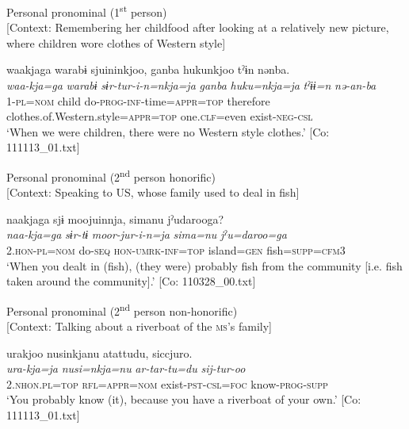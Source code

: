 \ea\label{ex:6-99}
 \ea Personal pronominal (1\textsuperscript{st} person)\\{}
[Context: Remembering her childfood after looking at a relatively new picture, where children wore clothes of Western style]

{\TM}
\glll waakjaga  warabɨ  sjuininkjoo,  ganba      hukunkjoo  tˀɨn  nənba.\\
      \textit{waa-kja=ga}  \textit{warabɨ}  \textit{sɨr-tur-i-n=nkja=ja}  \textit{ganba}      \textit{huku=nkja=ja}  \textit{tˀɨɨ=n}  \textit{nə-an-ba}\\
      1-\textsc{pl}=\textsc{nom}  child  do-\textsc{prog}-\textsc{inf}-time=\textsc{appr}=\textsc{top}  therefore      clothes.of.Western.style=\textsc{appr}=\textsc{top}  one.\textsc{clf}=even  exist-\textsc{neg}-\textsc{csl}\\
\glt ‘When we were children, there were no Western style clothes.’ [Co: 111113\_01.txt]
\z

\ex Personal pronominal (2\textsuperscript{nd} person honorific)\\{}
[Context: Speaking to US, whose family used to deal in fish]

{\TM}
\glll naakjaga  sjɨ  moojuinnja,  simanu      jˀudarooga?\\
      \textit{naa-kja=ga}  \textit{sɨr-tɨ}  \textit{moor-jur-i-n=ja}  \textit{sima=nu}     \textit{jˀu=daroo=ga}\\
      2.\textsc{hon}-\textsc{pl}=\textsc{nom}  do-\textsc{seq}  \textsc{hon}-\textsc{umrk}-\textsc{inf}=\textsc{top}  island=\textsc{gen}      fish=\textsc{supp}=\textsc{cfm}3\\
\glt ‘When you dealt in (fish), (they were) probably fish from the community [i.e. fish taken around the community].’ [Co: 110328\_00.txt]
\z

\ex Personal pronominal (2\textsuperscript{nd} person non-honorific)\\{}
[Context: Talking about a riverboat of the \textsc{ms}’s family]

{\TM}
\glll urakjoo  nusinkjanu  atattudu,  siccjuro.\\
      \textit{ura-kja=ja}  \textit{nusi=nkja=nu}  \textit{ar-tar-tu=du}  \textit{sij-tur-oo}\\
      2.\textsc{nhon}.\textsc{pl}=\textsc{top}  \textsc{rfl}=\textsc{appr}=\textsc{nom}  exist-\textsc{pst}-\textsc{csl}=\textsc{foc}      know-\textsc{prog}-\textsc{supp}\\
\glt ‘You probably know (it), because you have a riverboat of your own.’ [Co: 111113\_01.txt]
\z

